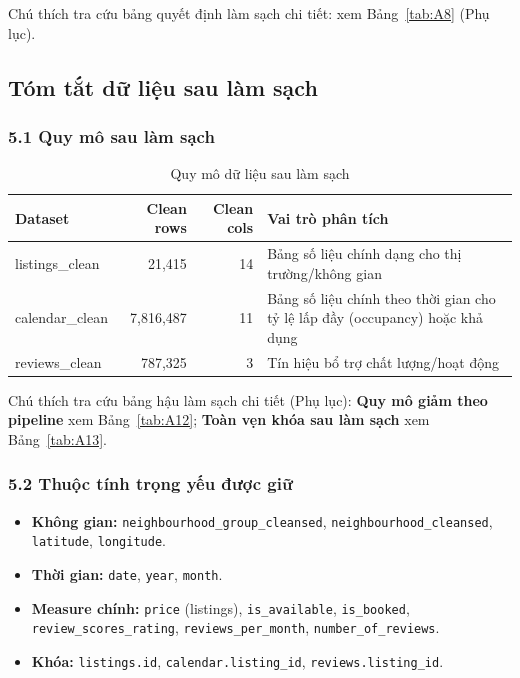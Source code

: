 Chú thích tra cứu bảng quyết định làm sạch chi tiết: xem Bảng~\ref{tab:A8} (Phụ lục).

\subsection{Tóm tắt dữ liệu sau làm sạch}

\subsubsection*{5.1 Quy mô sau làm sạch}

\begin{table}[htbp]
\centering
\caption{Quy mô dữ liệu sau làm sạch}
\begin{tabularx}{\textwidth}{@{} l r r X @{}}
\toprule
\textbf{Dataset} & \textbf{Clean rows} & \textbf{Clean cols} & \textbf{Vai trò phân tích} \\
\midrule
listings\_clean  & 21,415    & 14 & Bảng số liệu chính dạng cho thị trường/không gian \\ \hline
calendar\_clean  & 7,816,487 & 11 & Bảng số liệu chính theo thời gian cho tỷ lệ lấp đầy (occupancy) hoặc khả dụng \\ \hline
reviews\_clean   & 787,325   & 3  & Tín hiệu bổ trợ chất lượng/hoạt động \\
\bottomrule
\end{tabularx}
\end{table}

Chú thích tra cứu bảng hậu làm sạch chi tiết (Phụ lục): \textbf{Quy mô giảm theo pipeline} xem Bảng~\ref{tab:A12}; \textbf{Toàn vẹn khóa sau làm sạch} xem Bảng~\ref{tab:A13}.

\subsubsection*{5.2 Thuộc tính trọng yếu được giữ}

\begin{itemize}
    \item \textbf{Không gian:} \texttt{neighbourhood\_group\_cleansed}, \texttt{neighbourhood\_cleansed}, \texttt{latitude}, \texttt{longitude}.
    \item \textbf{Thời gian:} \texttt{date}, \texttt{year}, \texttt{month}.
    \item \textbf{Measure chính:} \texttt{price} (listings), \texttt{is\_available}, \texttt{is\_booked}, \texttt{review\_scores\_rating}, \texttt{reviews\_per\_month}, \texttt{number\_of\_reviews}.
    \item \textbf{Khóa:} \texttt{listings.id}, \texttt{calendar.listing\_id}, \texttt{reviews.listing\_id}.
\end{itemize}

